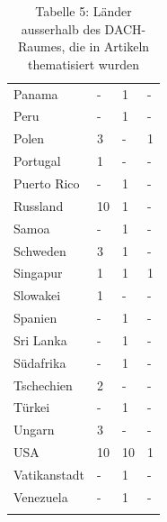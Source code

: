 \documentclass[a4paper,
fontsize=11pt,
oneside,
numbers=noperiodatend,
parskip=half-,
bibliography=totoc,
final
]{scrartcl}
\begin{document}
\begin{longtable}{llll}
Panama                    & -                    & 1                    & -                    \\
Peru                      & -                    & 1                    & -                    \\
Polen                     & 3                    & -                    & 1                    \\
Portugal                  & 1                    & -                    & -                    \\
Puerto Rico               & -                    & 1                    & -                    \\
Russland                  & 10                   & 1                    & -                    \\
Samoa                     & -                    & 1                    & -                    \\
Schweden                  & 3                    & 1                    & -                    \\
Singapur                  & 1                    & 1                    & 1                    \\
Slowakei                  & 1                    & -                    & -                    \\
Spanien                   & -                    & 1                    & -                    \\
Sri Lanka                 & -                    & 1                    & -                    \\
Südafrika                 & -                    & 1                    & -                    \\
Tschechien                & 2                    & -                    & -                    \\
Türkei                    & -                    & 1                    & -                    \\
Ungarn                    & 3                    & -                    & -                    \\
USA                       & 10                   & 10                   & 1                    \\
Vatikanstadt              & -                    & 1                    & -                    \\
Venezuela                 & -                    & 1                    & -                     \\
\caption{Tabelle 5: Länder ausserhalb des DACH-Raumes, die in Artikeln thematisiert wurden} \\
\end{longtable}
\end{document}
